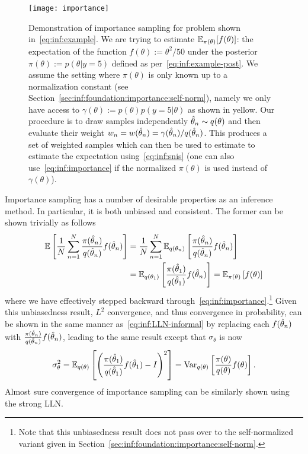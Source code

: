 \begin{figure}[t]
	\centering
	\texttt{[image: importance]}
	\caption{Demonstration of importance sampling for problem shown in~\eqref{eq:inf:example}.
		 We are trying to estimate $\mathbb{E}_{\pi(\theta)} [f(\theta)]$: the expectation of the function $f(\theta) := \theta^2/50$
		under the posterior $\pi(\theta):=p(\theta|y=5)$ defined as per~\eqref{eq:inf:example-post}.
		We assume the setting where $\pi(\theta)$ is only known up to a normalization constant
		(see Section~\ref{sec:inf:foundation:importance:self-norm}), namely we only have access
		to $\gamma(\theta) := p(\theta)p(y=5 | \theta)$ as shown in yellow.  Our procedure is to draw
		samples independently $\hat{\theta}_n \sim q(\theta)$ and then evaluate their weight 
		$w_n = w(\hat{\theta}_n) = \gamma(\hat{\theta}_n)/q(\hat{\theta}_n)$.  This produces a set of weighted samples
		which can then be used to estimate to estimate the expectation using~\eqref{eq:inf:snis}
		(one can also use~\eqref{eq:inf:importance} if the normalized $\pi(\theta)$ is used instead of
		$\gamma(\theta)$).
		\label{fig:inf:importance}}
\end{figure}

Importance sampling has a number of desirable properties as an inference method.
In particular, it is both unbiased and consistent.  The former can be shown trivially
as follows
\begin{align}
\mathbb{E} \left[\frac{1}{N} \sum_{n=1}^{N} \frac{\pi(\hat{\theta}_n)}{q(\hat{\theta}_n)} f(\hat{\theta}_n)\right] &=
\frac{1}{N} \sum_{n=1}^{N} \mathbb{E} _{q(\theta_n)}\left[\frac{\pi(\hat{\theta}_n)}{q(\hat{\theta}_n)} f(\hat{\theta}_n)\right] \nonumber \\
&=\mathbb{E} _{q(\theta_1)}\left[\frac{\pi(\hat{\theta}_1)}{q(\hat{\theta}_1)} f(\hat{\theta}_n)\right] =
\mathbb{E} _{\pi(\theta)}\left[f(\theta)\right]
\end{align}
where we have effectively stepped backward through~\eqref{eq:inf:importance}.\footnote{Note that
	this unbiasedness result does not pass over to the self-normalized variant given 
	in Section~\ref{sec:inf:foundation:importance:self-norm}.}
Given this unbiasedness result, $L^2$ convergence, and thus convergence in probability,
can be shown in the same manner as~\eqref{eq:inf:LLN-informal} by replacing
each $f(\hat{\theta}_n)$ with $\frac{\pi(\hat{\theta}_n)}{q(\hat{\theta}_n)} f(\hat{\theta}_n)$, leading to the
same result except that $\sigma_{\theta}$ is now
\begin{align}
\label{eq:inf:sigma-imp}
\sigma_{\theta}^2 = \mathbb{E}_{q(\theta)} \left[\left(\frac{\pi(\hat{\theta}_1)}{q(\hat{\theta}_1)} f(\hat{\theta}_1)-I\right)^2\right]
= \mathrm{Var}_{q(\theta)} \left[\frac{\pi(\theta)}{q(\theta)} f(\theta)\right].
\end{align}
Almost sure convergence of importance sampling can be similarly shown using
the strong LLN.

